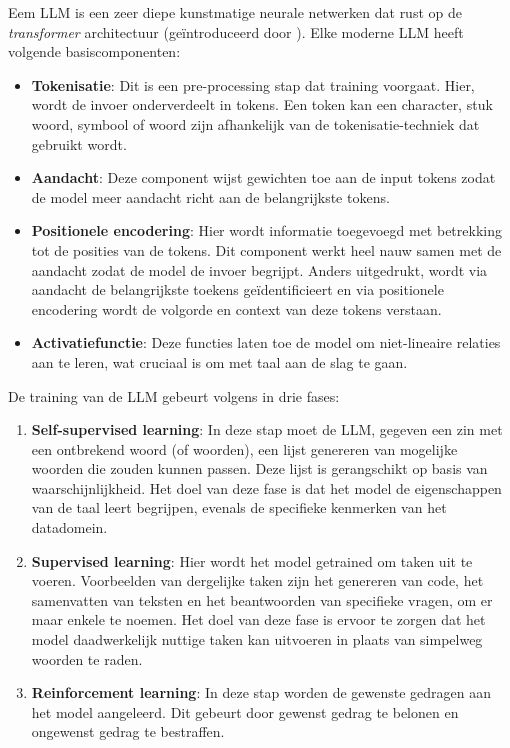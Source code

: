 Eem LLM is een zeer diepe kunstmatige neurale netwerken dat rust op de \textit{transformer} architectuur (geïntroduceerd door \textcite{Vaswani2017}). Elke moderne LLM heeft volgende basiscomponenten: 
\begin{itemize} 
    \item \textbf{Tokenisatie}: Dit is een pre-processing stap dat training voorgaat. Hier, wordt de invoer onderverdeelt in tokens. Een token kan een character, stuk woord, symbool of woord zijn afhankelijk van de tokenisatie-techniek dat gebruikt wordt.
    \item \textbf{Aandacht}: Deze component wijst gewichten toe aan de input tokens zodat de model meer aandacht richt aan de belangrijkste tokens.
    \item \textbf{Positionele encodering}: Hier wordt informatie toegevoegd met betrekking tot de posities van de tokens. Dit component werkt heel nauw samen met de aandacht zodat de model de invoer begrijpt. Anders uitgedrukt, wordt via aandacht de belangrijkste toekens geïdentificieert en via positionele encodering wordt de volgorde en context van deze tokens verstaan.
    \item \textbf{Activatiefunctie}: Deze functies laten toe de model om niet-lineaire relaties aan te leren, wat cruciaal is om met taal aan de slag te gaan.
\end{itemize}

De training van de LLM gebeurt volgens \textcite{Bach2024} in drie fases:
\begin{enumerate} 
    \item \textbf{Self-supervised learning}: In deze stap moet de LLM, gegeven een zin met een ontbrekend woord (of woorden), een lijst genereren van mogelijke woorden die zouden kunnen passen. Deze lijst is gerangschikt op basis van waarschijnlijkheid. Het doel van deze fase is dat het model de eigenschappen van de taal leert begrijpen, evenals de specifieke kenmerken van het datadomein.
    \item \textbf{Supervised learning}: Hier wordt het model getrained om taken uit te voeren. Voorbeelden van dergelijke taken zijn het genereren van code, het samenvatten van teksten en het beantwoorden van specifieke vragen, om er maar enkele te noemen. Het doel van deze fase is ervoor te zorgen dat het model daadwerkelijk nuttige taken kan uitvoeren in plaats van simpelweg woorden te raden.
    \item \textbf{Reinforcement learning}: In deze stap worden de gewenste gedragen aan het model aangeleerd. Dit gebeurt door gewenst gedrag te belonen en ongewenst gedrag te bestraffen.
\end{enumerate}

